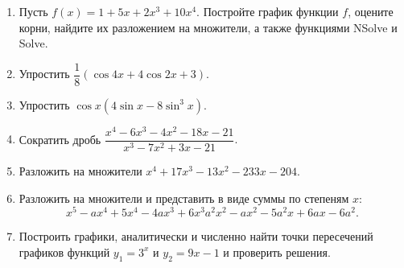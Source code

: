 \documentclass[preview]{standalone}
\begin{document}
\begin{enumerate}
	\item Пусть $f(x)=1+5x + 2x^3 + 10x^4$. Постройте график функции $f$, оцените корни, найдите их разложением на множители, а также функциями NSolve и Solve. 
	\item Упростить $\dfrac{1}{8}(\cos4x + 4\cos2x + 3)$.
	\item Упростить $\cos x(4\sin x - 8\sin^3 x)$.
	\item Сократить дробь $\dfrac{x^4 - 6x^3 - 4x^2 - 18x - 21}{x^3 - 7x^2 +3x - 21}.$
	\item Разложить на множители $x^4 + 17x^3 - 13x^2 - 233x - 204$.
	\item Разложить на множители и представить в виде суммы по степеням $x$:
	\[
	x^5 - ax^4 + 5x^4 - 4ax^3 + 6x^3  a^2 x^2 - a x^2 - 5a^2 x + 6 a x - 6a^2.
	\]
	\item Построить графики, аналитически и численно найти точки пересечений графиков функций $y_1=3^x$ и $y_2=9x-1$  и проверить решения.
\end{enumerate}
\end{document}
